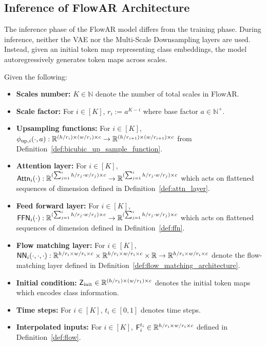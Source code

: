 \subsection{Inference of FlowAR Architecture}\label{sec:inference_of_flowar}
The inference phase of the FlowAR model differs from the training phase. During inference, neither the VAE nor the Multi-Scale Downsampling layers are used. Instead, given an initial token map representing class embeddings, the model autoregressively generates token maps across scales.
\begin{definition}\label{def:flow_architecture_inference}
    Given the following:
    \begin{itemize}
        \item {\bf Scales number:} $K \in \mathbb{N}$ denote the number of total scales in FlowAR.
        \item {\bf Scale factor:} For $i \in [K]$, $r_i:= a^{K-i}$ where base factor $a \in \mathbb{N}^+$.
        \item {\bf Upsampling functions:}  For $i \in [K]$, $\phi_{\mathrm{up},i}(\cdot,a): \mathbb{R}^{(h/r_i) \times (w/r_i) \times c}\to \mathbb{R}^{(h/r_{i+1}) \times (w/r_{i+1}) \times c}$ from Definition~\ref{def:bicubic_up_sample_function}.
        \item {\bf Attention layer:}  For $i \in [K]$, $\mathsf{Attn}_i(\cdot):\mathbb{R}^{(\sum_{j=1}^i h/r_j \cdot w/r_{j})\times c} \to \mathbb{R}^{(\sum_{j=1}^i h/r_j \cdot w/r_{j})\times c}$ which acts on flattened sequences of dimension defined in Definition~\ref{def:attn_layer}.
        \item {\bf Feed forward layer: } For $i \in [K]$, $\mathsf{FFN}_i(\cdot): \mathbb{R}^{(\sum_{j=1}^i h/r_j \cdot w/r_{j})\times c} \to \mathbb{R}^{(\sum_{j=1}^i h/r_j \cdot w/r_{j})\times c}$ which acts on flattened sequences of dimension defined in Definition~\ref{def:ffn}.
        \item {\bf Flow matching layer:} For $i \in [K]$, $\mathsf{NN}_i(\cdot,\cdot,\cdot):\mathbb{R}^{h/r_i \times w/r_i \times c}\times \mathbb{R}^{h/r_i \times w/r_i \times c}\times \mathbb{R} \to \mathbb{R}^{h/r_i \times w/r_i \times c}$ denote the flow-matching layer defined in Definition~\ref{def:flow_matching_architecture}.
        \item {\bf Initial condition:} $\mathsf{Z}_{\mathrm{init}} \in \mathbb{R}^{(h/r_1) \times (w/r_1) \times c}$ denotes the initial token maps which encodes class information.
        \item {\bf Time steps:} For $i \in [K]$, $t_i \in [0,1]$ denotes time steps.
        \item {\bf Interpolated inputs:} For $i \in [K]$, $\mathsf{F}_i^{t_i} \in \mathbb{R}^{h/r_i \times w/r_i \times c}$ defined in Definition~\ref{def:flow}.

\end{itemize}
\end{definition}
